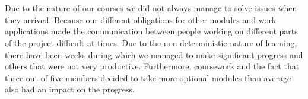 \documentclass[10pt, a4paper]{report}
\begin{document}
\\\\
Due to the nature of our courses we did not always manage to solve issues when they arrived. Because our different obligations for other modules and work applications made the communication between people working on different parts of the project difficult at times. Due to the non deterministic nature of learning, there have been weeks during which we managed to make significant progress and others that were not very productive. Furthermore, coursework and the fact that three out of five members decided to take more optional modules than average also had an impact on the progress.
\end{document}
